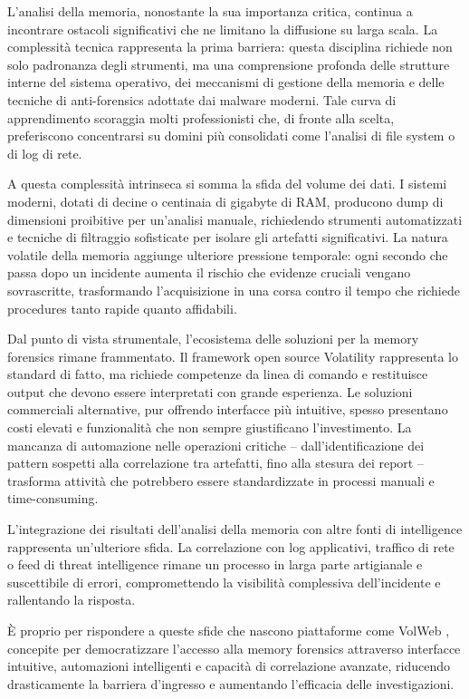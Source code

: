 L'analisi della memoria, nonostante la sua importanza critica, continua a incontrare ostacoli significativi che ne limitano la diffusione su larga scala. La complessità tecnica rappresenta la prima barriera: questa disciplina richiede non solo padronanza degli strumenti, ma una comprensione profonda delle strutture interne del sistema operativo, dei meccanismi di gestione della memoria e delle tecniche di anti-forensics adottate dai malware moderni. Tale curva di apprendimento scoraggia molti professionisti che, di fronte alla scelta, preferiscono concentrarsi su domini più consolidati come l'analisi di file system o di log di rete.

A questa complessità intrinseca si somma la sfida del volume dei dati. I sistemi moderni, dotati di decine o centinaia di gigabyte di RAM, producono dump di dimensioni proibitive per un'analisi manuale, richiedendo strumenti automatizzati e tecniche di filtraggio sofisticate per isolare gli artefatti significativi. La natura volatile della memoria aggiunge ulteriore pressione temporale: ogni secondo che passa dopo un incidente aumenta il rischio che evidenze cruciali vengano sovrascritte, trasformando l'acquisizione in una corsa contro il tempo che richiede procedures tanto rapide quanto affidabili.

Dal punto di vista strumentale, l'ecosistema delle soluzioni per la memory forensics rimane frammentato. Il framework open source Volatility rappresenta lo standard di fatto, ma richiede competenze da linea di comando e restituisce output che devono essere interpretati con grande esperienza. Le soluzioni commerciali alternative, pur offrendo interfacce più intuitive, spesso presentano costi elevati e funzionalità che non sempre giustificano l'investimento. La mancanza di automazione nelle operazioni critiche – dall'identificazione dei pattern sospetti alla correlazione tra artefatti, fino alla stesura dei report – trasforma attività che potrebbero essere standardizzate in processi manuali e time-consuming.

L'integrazione dei risultati dell'analisi della memoria con altre fonti di intelligence rappresenta un'ulteriore sfida. La correlazione con log applicativi, traffico di rete o feed di threat intelligence rimane un processo in larga parte artigianale e suscettibile di errori, compromettendo la visibilità complessiva dell'incidente e rallentando la risposta.

È proprio per rispondere a queste sfide che nascono piattaforme come VolWeb \cite{volweb2024}, concepite per democratizzare l'accesso alla memory forensics attraverso interfacce intuitive, automazioni intelligenti e capacità di correlazione avanzate, riducendo drasticamente la barriera d'ingresso e aumentando l'efficacia delle investigazioni.

